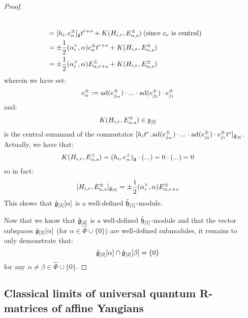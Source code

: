 \begin{proof}
\begin{itemize}
$$\begin{aligned}
                                \\
                                & = [ h_i, e_{\alpha}^{\pm} ]_{\mathfrak{g}} t^{r + s} + K(H_{i, r}, E_{\alpha, s}^{\pm}) \: \text{(since $c_v$ is central)}
                                \\
                                & = \pm \frac12 (\alpha_i^{\vee}, \alpha) e_{\alpha}^{\pm} t^{r + s} + K(H_{i, r}, E_{\alpha, s}^{\pm})
                                \\
                                & = \pm \frac12 (\alpha_i^{\vee}, \alpha) E_{\alpha, r + s}^{\pm} + K(H_{i, r}, E_{\alpha, s}^{\pm})
                            \end{aligned}
                        $$
                    wherein we have set:
                        $$e_{\alpha}^{\pm} := \mathrm{ad}(e_{j_m}^{\pm}) \cdot ... \cdot \mathrm{ad}(e_{j_2}^{\pm}) \cdot e_{j_1}^{\pm}$$
                    and:
                        $$K(H_{i, r}, E_{\alpha, s}^{\pm}) \in \mathfrak{z}_{[2]}$$
                    is the central summand of the commutator $[ h_i t^r, \mathrm{ad}(e_{j_m}^{\pm}) \cdot ... \cdot \mathrm{ad}(e_{j_2}^{\pm}) \cdot e_{j_1}^{\pm} t^s ]_{\tilde{\mathfrak{g}}_{[2]}}$. Actually, we have that:
                        $$K(H_{i, r}, E_{\alpha, s}^{\pm}) = (h_i, e_{\alpha}^{\pm})_{\mathfrak{g}} \cdot (...) = 0 \cdot (...) = 0$$
                    so in fact:
                        $$[H_{i, r}, E_{\alpha, s}^{\pm}]_{\tilde{\mathfrak{g}}_{[2]}} = \pm \frac12 (\alpha_i^{\vee}, \alpha) E_{\alpha, r + s}^{\pm}$$
                    This shows that $\tilde{\mathfrak{g}}_{[2]}[\alpha]$ is a well-defined $\tilde{\mathfrak{h}}_{[1]}$-module. 
                \end{itemize}

                Now that we know that $\tilde{\mathfrak{g}}_{[2]}$ is a well-defined $\tilde{\mathfrak{h}}_{[1]}$-module and that the vector subspaces $\tilde{\mathfrak{g}}_{[2]}[\alpha]$ (for $\alpha \in \hat{\Phi} \cup \{0\}$) are well-defined submodules, it remains to only demonstrate that:
                    $$\tilde{\mathfrak{g}}_{[2]}[\alpha] \cap \tilde{\mathfrak{g}}_{[2]}[\beta] = \{0\}$$
                for any $\alpha \not = \beta \in \hat{\Phi} \cup \{0\}$.  
            \end{proof}

    \subsection{Classical limits of universal quantum R-matrices of affine Yangians}